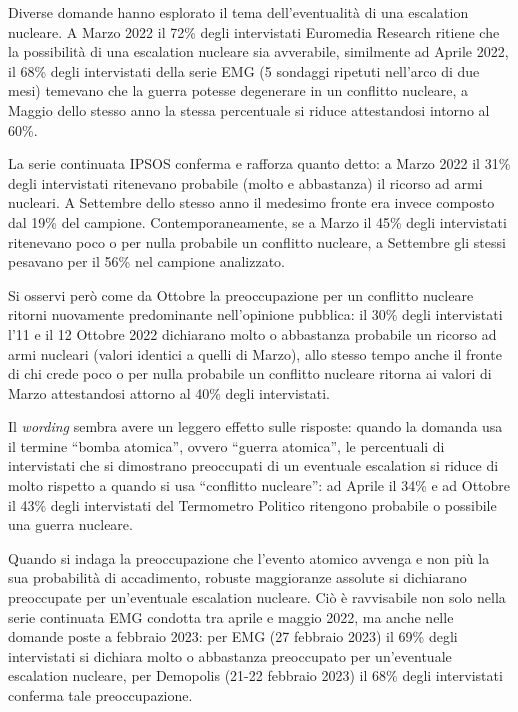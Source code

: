 \documentclass[
  openany]{book}
\begin{document}
Diverse domande hanno esplorato il tema dell'eventualità di una escalation nucleare. A Marzo 2022 il 72\% degli intervistati Euromedia Research ritiene che la possibilità di una escalation nucleare sia avverabile, similmente ad Aprile 2022, il 68\% degli intervistati della serie EMG (5 sondaggi ripetuti nell'arco di due mesi) temevano che la guerra potesse degenerare in un conflitto nucleare, a Maggio dello stesso anno la stessa percentuale si riduce attestandosi intorno al 60\%.

La serie continuata IPSOS conferma e rafforza quanto detto: a Marzo 2022 il 31\% degli intervistati ritenevano probabile (molto e abbastanza) il ricorso ad armi nucleari. A Settembre dello stesso anno il medesimo fronte era invece composto dal 19\% del campione. Contemporaneamente, se a Marzo il 45\% degli intervistati ritenevano poco o per nulla probabile un conflitto nucleare, a Settembre gli stessi pesavano per il 56\% nel campione analizzato.

Si osservi però come da Ottobre la preoccupazione per un conflitto nucleare ritorni nuovamente predominante nell'opinione pubblica: il 30\% degli intervistati l'11 e il 12 Ottobre 2022 dichiarano molto o abbastanza probabile un ricorso ad armi nucleari (valori identici a quelli di Marzo), allo stesso tempo anche il fronte di chi crede poco o per nulla probabile un conflitto nucleare ritorna ai valori di Marzo attestandosi attorno al 40\% degli intervistati.

Il \emph{wording} sembra avere un leggero effetto sulle risposte: quando la domanda usa il termine ``bomba atomica'', ovvero ``guerra atomica'', le percentuali di intervistati che si dimostrano preoccupati di un eventuale escalation si riduce di molto rispetto a quando si usa ``conflitto nucleare'': ad Aprile il 34\% e ad Ottobre il 43\% degli intervistati del Termometro Politico ritengono probabile o possibile una guerra nucleare.

Quando si indaga la preoccupazione che l'evento atomico avvenga e non più la sua probabilità di accadimento, robuste maggioranze assolute si dichiarano preoccupate per un'eventuale escalation nucleare. Ciò è ravvisabile non solo nella serie continuata EMG condotta tra aprile e maggio 2022, ma anche nelle domande poste a febbraio 2023: per EMG (27 febbraio 2023) il 69\% degli intervistati si dichiara molto o abbastanza preoccupato per un'eventuale escalation nucleare, per Demopolis (21-22 febbraio 2023) il 68\% degli intervistati conferma tale preoccupazione.
\end{document}
